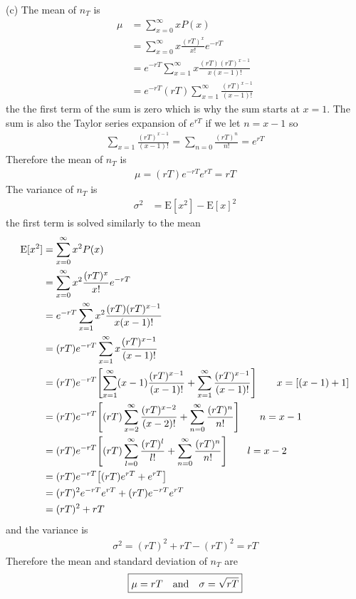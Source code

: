 \documentclass[../main.tex]{subfiles}
\newcommand{\E}{\mathrm{E}}
\begin{document}
(c) The mean of $n_T$ is
\begin{align*}
    \mu &= \sum_{x=0}^{\infty} x P(x) \\
    &= \sum_{x=0}^{\infty} x \frac{(rT)^x}{x!} e^{-rT} \\
    &= e^{-rT} \sum_{x=1}^{\infty} x\frac{(rT)(rT)^{x-1}}{x(x-1)!} \\
    &= e^{-rT} (rT) \sum_{x=1}^{\infty} \frac{(rT)^{x-1}}{(x-1)!}
\end{align*}
the the first term of the sum is zero which is why the sum starts at $x = 1$. The sum is also
the Taylor series expansion of $e^{rT}$ if we let $n = x - 1$ so
\begin{align*}
    \sum_{x=1} \frac{(rT)^{x-1}}{(x-1)!} = \sum_{n=0} \frac{(rT)^n}{n!} = e^{rT}
\end{align*}
Therefore the mean of $n_T$ is
\begin{align*}
    \mu = (rT) e^{-rT} e^{rT} = rT
\end{align*}
The variance of $n_T$ is
\begin{align*}
    \sigma^2 &= \E[x^2] - \E[x]^2
\end{align*}
the first term is solved similarly to the mean
\begin{align*}
    \E[x^2] &= \sum_{x=0}^{\infty} x^2 P(x) \\
    &= \sum_{x=0}^{\infty} x^2 \frac{(rT)^x}{x!} e^{-rT} \\
    &= e^{-rT} \sum_{x=1}^{\infty} x^2 \frac{(rT)(rT)^{x-1}}{x(x-1)!} \\
    &= (rT) e^{-rT} \sum_{x=1}^{\infty} x \frac{(rT)^{x-1}}{(x-1)!} \\
    &= (rT) e^{-rT} \qt[\sum_{x=1}^{\infty} (x-1) \frac{(rT)^{x-1}}{(x-1)!} + 
    \sum_{x=1}^{\infty} \frac{(rT)^{x-1}}{(x-1)!}
    ] \qquad x = [(x - 1) + 1]\\
    &= (rT) e^{-rT} \qt[(rT)\sum_{x=2}^{\infty}  \frac{(rT)^{x-2}}{(x-2)!} +
    \sum_{n=0}^{\infty} \frac{(rT)^{n}}{n!}
    ] \qquad n = x - 1 \\
    &= (rT) e^{-rT} \qt[(rT)\sum_{l=0}^{\infty}  \frac{(rT)^{l}}{l!} +
    \sum_{n=0}^{\infty} \frac{(rT)^{n}}{n!}
    ] \qquad l = x - 2 \\
    &= (rT) e^{-rT} \qt[(rT) e^{rT} + e^{rT} ]  \\
    &= (rT)^2 e^{-rT} e^{rT} + (rT) e^{-rT} e^{rT} \\
    &= (rT)^2 + rT
\end{align*}
and the variance is
\begin{align*}
    \sigma^2 = (rT)^2 + rT - (rT)^2 = rT
\end{align*}
Therefore the mean and standard deviation of $n_T$ are
\begin{align*}
    \boxed{\mu = rT \qand \sigma = \sqrt{rT}}
\end{align*}
\end{document}
